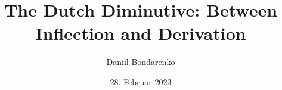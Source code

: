 
\title{The Dutch Diminutive: Between Inflection and Derivation} 
\newcommand{\Year}{2023}
\date{28. Februar \Year}
\newcommand{\thesisKind}{Bachelor}
\newcommand{\degree}{Bachelor~of~Arts~(B.A.)}
\newcommand{\versionnumber}{1}

\author{Daniil Bondarenko}
\newcommand{\matrikelno}{575836}
\newcommand{\email}{bondared@hu-berlin.de}

\newcommand{\fstAdvisor}{Prof.~Dr.~Dr.~h.c.~Artemis~Alexiadou}
\newcommand{\fstAdvisorsUniversity}{Humboldt-Universität zu Berlin} 
\newcommand{\fstAdvisorsDepartment}{Sprach- und literaturwissenschaftliche Fakultät} 
\newcommand{\fstAdvisorsAG}{Institut für Anglistik und Amerikanistik}
\newcommand{\fstAdvisorsCountry}{Deutschland}

\newcommand{\sndAdvisor}{Prof.~Dr.~Markus~Egg}
\newcommand{\sndAdvisorsUniversity}{Humboldt-Universität zu Berlin} %
\newcommand{\sndAdvisorsDepartment}{Sprach- und literaturwissenschaftliche Fakultät}
\newcommand{\sndAdvisorsAG}{Institut für Anglistik und Amerikanistik}
\newcommand{\sndAdvisorsCountry}{Deutschland}





%




